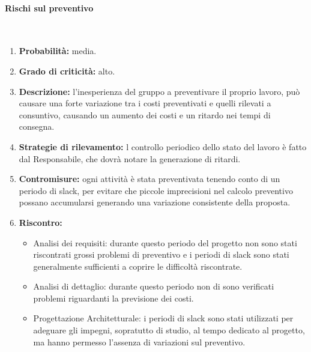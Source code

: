 \paragraph{Rischi sul preventivo}\mbox{}\\
\begin{enumerate}
	\item \textbf{Probabilità:} media.
	\item \textbf{Grado di criticità:} alto.
	\item \textbf{Descrizione:} l’inesperienza del gruppo a preventivare il proprio lavoro, può causare una forte variazione tra i costi preventivati e quelli rilevati a consuntivo, causando un aumento dei costi e un ritardo nei tempi di consegna.
	\item \textbf{Strategie di rilevamento:} l controllo periodico dello stato del lavoro è fatto dal Responsabile, che dovrà notare la generazione di ritardi.
	\item \textbf{Contromisure:} ogni attività è stata preventivata tenendo conto di un periodo di slack, per evitare che piccole imprecisioni nel calcolo preventivo possano accumularsi generando una variazione consistente della proposta.
	\item \textbf{Riscontro:}
	\begin{itemize}
	\item Analisi dei requisiti: durante questo periodo del progetto non sono stati riscontrati grossi problemi di preventivo e i periodi di slack sono stati generalmente sufficienti a coprire le difficoltà riscontrate.
	\item Analisi di dettaglio: durante questo periodo non di sono verificati problemi riguardanti la previsione dei costi.
	\item Progettazione Architetturale: i periodi di slack sono stati utilizzati per adeguare gli impegni, sopratutto di studio, al tempo dedicato al progetto, ma hanno permesso l'assenza di variazioni sul preventivo.
	\end{itemize}
\end{enumerate}
